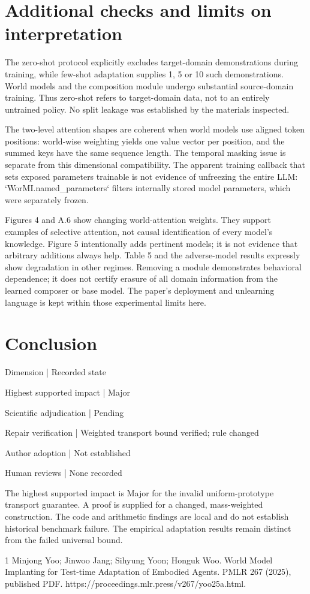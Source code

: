 \documentclass[10pt]{article}
\begin{document}
\section*{Additional checks and limits on interpretation}
The zero-shot protocol explicitly excludes target-domain demonstrations during training, while few-shot adaptation supplies 1, 5 or 10 such demonstrations. World models and the composition module undergo substantial source-domain training. Thus zero-shot refers to target-domain data, not to an entirely untrained policy. No split leakage was established by the materials inspected.\par
The two-level attention shapes are coherent when world models use aligned token positions: world-wise weighting yields one value vector per position, and the summed keys have the same sequence length. The temporal masking issue is separate from this dimensional compatibility. The apparent training callback that sets exposed parameters trainable is not evidence of unfreezing the entire LLM: `WorMI.named\_parameters` filters internally stored model parameters, which were separately frozen.\par
Figures 4 and A.6 show changing world-attention weights. They support examples of selective attention, not causal identification of every model’s knowledge. Figure 5 intentionally adds pertinent models; it is not evidence that arbitrary additions always help. Table 5 and the adverse-model results expressly show degradation in other regimes. Removing a module demonstrates behavioral dependence; it does not certify erasure of all domain information from the learned composer or base model. The paper’s deployment and unlearning language is kept within those experimental limits here.\par
\section*{Conclusion}
Dimension | Recorded state\par
Highest supported impact | Major\par
Scientific adjudication | Pending\par
Repair verification | Weighted transport bound verified; rule changed\par
Author adoption | Not established\par
Human reviews | None recorded\par
The highest supported impact is Major for the invalid uniform-prototype transport guarantee. A proof is supplied for a changed, mass-weighted construction. The code and arithmetic findings are local and do not establish historical benchmark failure. The empirical adaptation results remain distinct from the failed universal bound.\par
1 Minjong Yoo; Jinwoo Jang; Sihyung Yoon; Honguk Woo. World Model Implanting for Test-time Adaptation of Embodied Agents. PMLR 267 (2025), published PDF. https://proceedings.mlr.press/v267/yoo25a.html.\par
\end{document}
